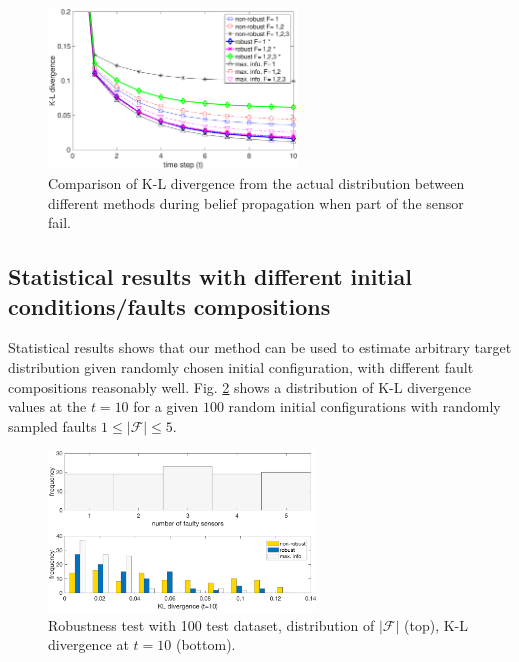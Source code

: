 \documentclass[letterpaper, 10 pt, conference]{ieeeconf}
\begin{document}
\begin{figure}
	\centering
	\includegraphics[width=2.6in]{figure/cost_comp000}
	\caption{Comparison of K-L divergence from the actual distribution between different methods during belief propagation when part of the sensor fail.}
	\label{fig:fig7}
\end{figure}


\subsection{Statistical results with different initial conditions/faults compositions}
Statistical results shows that our method can be used to estimate arbitrary target distribution given randomly chosen initial configuration, with different fault compositions reasonably well. 
Fig. \ref{fig:fig8} shows a distribution of K-L divergence values at the $t=10$ for a given $100$ random initial configurations with randomly sampled faults $1\leq \left|\mathcal{F}\right| \leq 5$.
\begin{figure}
	\centering
	\includegraphics[width=2.8in]{figure/stat_result}
	\caption{Robustness test with 100 test dataset, distribution of $\left|\mathcal{F}\right|$ (top), K-L divergence at $t=10$ (bottom).} 
	\label{fig:fig8}
\end{figure}

\end{document}
